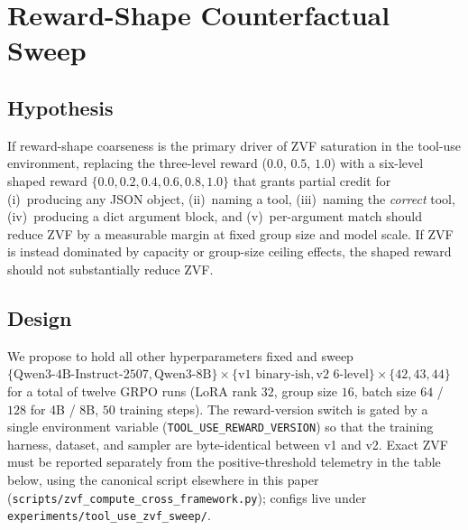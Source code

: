 
\section{Reward-Shape Counterfactual Sweep}
\label{app:zvf_counterfactual}

\subsection{Hypothesis}
If reward-shape coarseness is the primary driver of ZVF saturation in the
tool-use environment, replacing the three-level reward (\(0.0\), \(0.5\), \(1.0\))
with a six-level shaped reward
\(\{0.0, 0.2, 0.4, 0.6, 0.8, 1.0\}\)
that grants partial credit for (i)~producing any JSON object, (ii)~naming a
tool, (iii)~naming the \emph{correct} tool, (iv)~producing a dict argument
block, and (v)~per-argument match should reduce ZVF by a measurable margin at
fixed group size and model scale. If ZVF is instead dominated by capacity or
group-size ceiling effects, the shaped reward should not substantially reduce
ZVF.

\subsection{Design}
We propose to hold all other hyperparameters fixed and sweep
\(\{\text{Qwen3-4B-Instruct-2507}, \text{Qwen3-8B}\}
 \times \{\text{v1 binary-ish}, \text{v2 6-level}\}
 \times \{42, 43, 44\}\)
for a total of twelve GRPO runs
(LoRA rank \(32\), group size \(16\), batch size
\(64\) / \(128\) for 4B / 8B, \(50\) training steps).
The reward-version switch is gated by a single environment variable
(\texttt{TOOL\_USE\_REWARD\_VERSION}) so that the training harness, dataset,
and sampler are byte-identical between v1 and v2. Exact ZVF must be reported separately from the positive-threshold telemetry
in the table below, using the canonical script elsewhere in this paper
(\texttt{scripts/zvf\_compute\_cross\_framework.py}); configs live under
\texttt{experiments/tool\_use\_zvf\_sweep/}.

